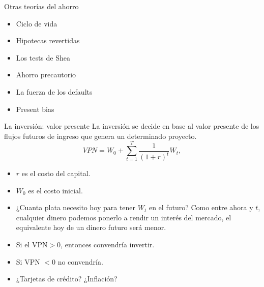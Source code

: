 \documentclass{beamer}
\begin{document}
\begin{frame}{Otras teorías del ahorro}
   \begin{itemize}
       \item Ciclo de vida
       \item Hipotecas revertidas
       \item Los tests de Shea
       \item Ahorro precautorio
       \item La fuerza de los defaults
       \item Present bias
   \end{itemize} 
\end{frame}


\begin{frame}{La inversión: valor presente}
    La inversión se decide en base al valor presente de los flujos futuros de ingreso que genera un determinado proyecto.
    \begin{equation}
        VPN = W_0 + \sum_{t=1} ^{T} \frac{1}{(1+r)^t} W_t,
    \end{equation}
    \begin{itemize}
        \item $r$ es el costo del capital.
        \item $W_0$ es el costo inicial.
        \item ¿Cuanta plata necesito hoy para tener $W_t$ en el futuro? Como entre ahora y $t$, cualquier dinero podemos ponerlo a rendir un interés del mercado, el equivalente hoy de un dinero futuro será menor.
        \item Si el VPN$>0$, entonces convendría invertir.
        \item Si VPN $<0$ no convendría.
        \item ¿Tarjetas de crédito? ¿Inflación?
    \end{itemize}
\end{frame}


     
\end{document}
